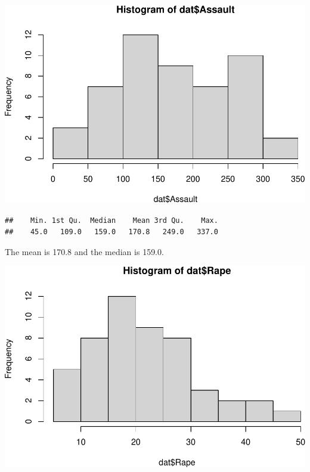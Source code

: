 \documentclass[
]{article}
\newenvironment{Shaded}{\begin{snugshade}}{\end{snugshade}}
\newcommand{\AttributeTok}[1]{\textcolor[rgb]{0.77,0.63,0.00}{#1}}
\newcommand{\FunctionTok}[1]{\textcolor[rgb]{0.00,0.00,0.00}{#1}}
\newcommand{\NormalTok}[1]{#1}
\newcommand{\SpecialCharTok}[1]{\textcolor[rgb]{0.00,0.00,0.00}{#1}}
\newcommand{\StringTok}[1]{\textcolor[rgb]{0.31,0.60,0.02}{#1}}
\begin{document}
\includegraphics{Assignments_files/figure-latex/unnamed-chunk-8-1.pdf}

\begin{Shaded}
\end{Shaded}

\begin{verbatim}
##    Min. 1st Qu.  Median    Mean 3rd Qu.    Max. 
##    45.0   109.0   159.0   170.8   249.0   337.0
\end{verbatim}

The mean is 170.8 and the median is 159.0.

\begin{Shaded}
\end{Shaded}

\includegraphics{Assignments_files/figure-latex/unnamed-chunk-10-1.pdf}
\end{document}
